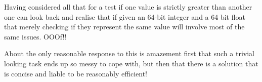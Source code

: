 Having considered all that for a test if one value is strictly greater than
another one can look back and realise that if given an 64-bit integer and
a 64 bit float that merely checking if they represent the same value
will involve most of the same issues. OOOf!!

About the only reasonable response to this is amazement first that such
a trivial looking task ends up so messy to cope with, but then that there
is a solution that is concise and liable to be reasonably efficient!

